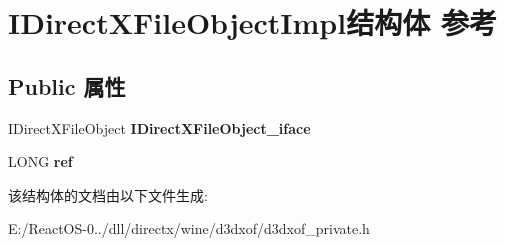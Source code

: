 \hypertarget{struct_i_direct_x_file_object_impl}{}\section{I\+Direct\+X\+File\+Object\+Impl结构体 参考}
\label{struct_i_direct_x_file_object_impl}
\subsection*{Public 属性}
\begin{DoxyCompactItemize}
\item 
\mbox{\label{struct_i_direct_x_file_object_impl_a79c5da658aab4ea91e262fb018ad59b3}} 
I\+Direct\+X\+File\+Object {\bfseries I\+Direct\+X\+File\+Object\+\_\+iface}
\item 
\mbox{\label{struct_i_direct_x_file_object_impl_a5aaec0f92307f01705bc51940749581d}} 
L\+O\+NG {\bfseries ref}
\end{DoxyCompactItemize}


该结构体的文档由以下文件生成\+:\begin{DoxyCompactItemize}
\item 
E\+:/\+React\+O\+S-\/0../dll/directx/wine/d3dxof/d3dxof\+\_\+private.\+h\end{DoxyCompactItemize}
